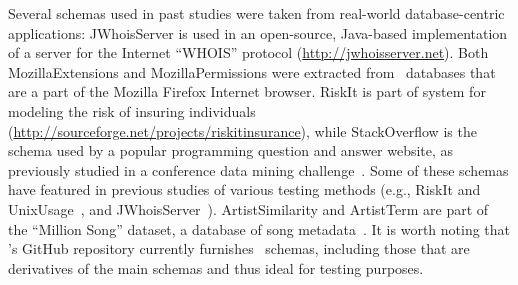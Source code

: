 Several schemas used in past studies were taken from real-world database-centric applications: {JWhoisServer} is used in
an open-source, Java-based implementation of a server for the Internet ``WHOIS'' protocol
(\url{http://jwhoisserver.net}).  Both {MozillaExtensions} and {MozillaPermissions} were extracted from
\SQLite~databases that are a part of the Mozilla Firefox Internet browser.  {RiskIt} is part of system for modeling the
risk of insuring individuals (\url{http://sourceforge.net/projects/riskitinsurance}), while {StackOverflow} is the
schema used by a popular programming question and answer website, as previously studied in a conference data mining
challenge~\cite{MSRChallenge2013}. Some of these schemas have featured in previous studies of various testing methods
(e.g., {RiskIt} and {UnixUsage}~\cite{Pan2011b}, and {JWhoisServer}~\cite{Cobb2011}).  {ArtistSimilarity} and
{ArtistTerm} are part of the ``Million Song'' dataset, a database of song metadata~\cite{Bertin-Mahieux2011}. It is
worth noting that \sa's GitHub repository currently furnishes \numprovidedschemas~schemas, including those that are
derivatives of the main schemas and thus ideal for testing purposes.



